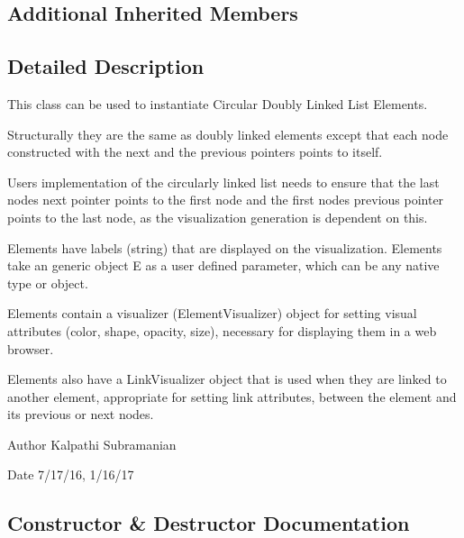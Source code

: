 \subsection*{Additional Inherited Members}


\subsection{Detailed Description}
This class can be used to instantiate Circular Doubly Linked List Elements. 

Structurally they are the same as doubly linked elements except that each node constructed with the next and the previous pointers points to itself.

User\textquotesingle{}s implementation of the circularly linked list needs to ensure that the last node\textquotesingle{}s next pointer points to the first node and the first node\textquotesingle{}s previous pointer points to the last node, as the visualization generation is dependent on this.

Elements have labels (string) that are displayed on the visualization. Elements take an generic object E as a user defined parameter, which can be any native type or object.

Elements contain a visualizer (Element\+Visualizer) object for setting visual attributes (color, shape, opacity, size), necessary for displaying them in a web browser.

Elements also have a Link\+Visualizer object that is used when they are linked to another element, appropriate for setting link attributes, between the element and its previous or next nodes.

\begin{DoxyAuthor}{Author}
Kalpathi Subramanian
\end{DoxyAuthor}
\begin{DoxyDate}{Date}
7/17/16, 1/16/17 
\end{DoxyDate}


\subsection{Constructor \& Destructor Documentation}
\mbox{\label{classbridges_1_1circ__dl__element_1_1_circ_d_lelement_a13ff6ca8a1b7e88cb986547c68d8fc00}} 
